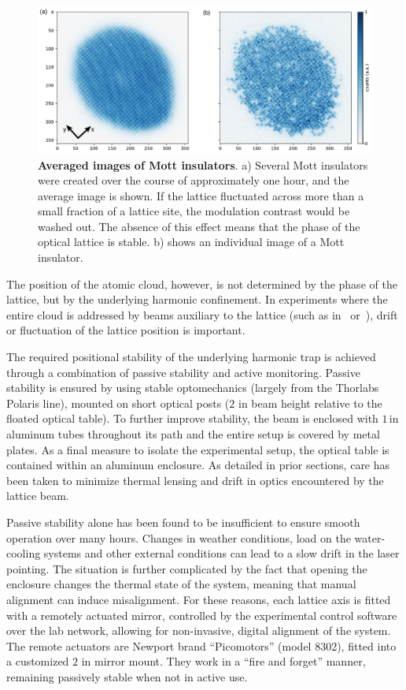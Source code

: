 \documentclass[twocolumn,aps,pra,showpacs,preprintnumbers,bibnotes]{revtex4-1}
\begin{document}
\begin{figure}
  \begin{center}
    \includegraphics{fig/AveragedMI.pdf}
    \caption{\textbf{Averaged images of Mott insulators}. a) Several Mott insulators were created over the course of approximately one hour, and the average image is shown\cite{Greif2016}. If the lattice fluctuated across more than a small fraction of a lattice site, the modulation contrast would be washed out. The absence of this effect means that the phase of the optical lattice is stable. b) shows an individual image of a Mott insulator.}\label{fig:averaged_mott}
  \end{center}
\end{figure}


The position of the atomic cloud, however, is not determined by the phase of the lattice, but by the underlying harmonic confinement.
In experiments where the entire cloud is addressed by beams auxiliary to the lattice (such as in~\cite{Mazurenko2016} or~\cite{Choi2016}), drift or fluctuation of the lattice position is important.

The required positional stability of the underlying harmonic trap is achieved through a combination of passive stability and active monitoring.
Passive stability is ensured by using stable optomechanics (largely from the Thorlabs Polaris line), mounted on short optical posts ($2$ in beam height relative to the floated optical table).
To further improve stability, the beam is enclosed with $1\,$in aluminum tubes throughout its path and the entire setup is covered by metal plates.
As a final measure to isolate the experimental setup, the optical table is contained within an aluminum enclosure. As detailed in prior sections, care has been taken to minimize thermal lensing and drift in optics encountered by the lattice beam.

Passive stability alone has been found to be insufficient to ensure smooth operation over many hours. Changes in weather conditions, load on the water-cooling systems and other external conditions can lead to a slow drift in the laser pointing.
The situation is further complicated by the fact that opening the enclosure changes the thermal state of the system, meaning that manual alignment can induce misalignment.
For these reasons, each lattice axis is fitted with a remotely actuated mirror, controlled by the experimental control software over the lab network, allowing for non-invasive, digital alignment of the system.
The remote actuators are Newport brand ``Picomotors'' (model 8302), fitted into a customized $2$ in mirror mount.
They work in a ``fire and forget'' manner, remaining passively stable when not in active use.
\end{document}

